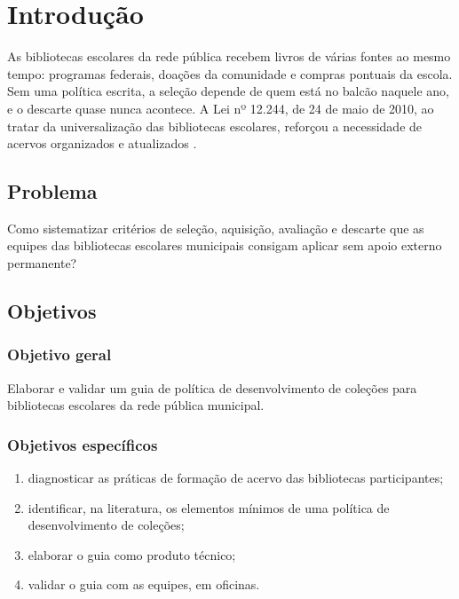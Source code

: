 \chapter{Introdução}
\label{cap:introducao}


As bibliotecas escolares da rede pública recebem livros de várias fontes ao mesmo tempo: programas federais, doações da comunidade e compras pontuais da escola. Sem uma política escrita, a seleção depende de quem está no balcão naquele ano, e o descarte quase nunca acontece. A Lei nº 12.244, de 24 de maio de 2010, ao tratar da universalização das bibliotecas escolares, reforçou a necessidade de acervos organizados e atualizados \cite{brasil2010}.

\section{Problema}

Como sistematizar critérios de seleção, aquisição, avaliação e descarte que as equipes das bibliotecas escolares municipais consigam aplicar sem apoio externo permanente?

\section{Objetivos}
\subsection{Objetivo geral}
Elaborar e validar um guia de política de desenvolvimento de coleções para bibliotecas escolares da rede pública municipal.

\subsection{Objetivos específicos}
\begin{enumerate}[label=\alph*)]
  \item diagnosticar as práticas de formação de acervo das bibliotecas participantes;
  \item identificar, na literatura, os elementos mínimos de uma política de desenvolvimento de coleções;
  \item elaborar o guia como produto técnico;
  \item validar o guia com as equipes, em oficinas.
\end{enumerate}

